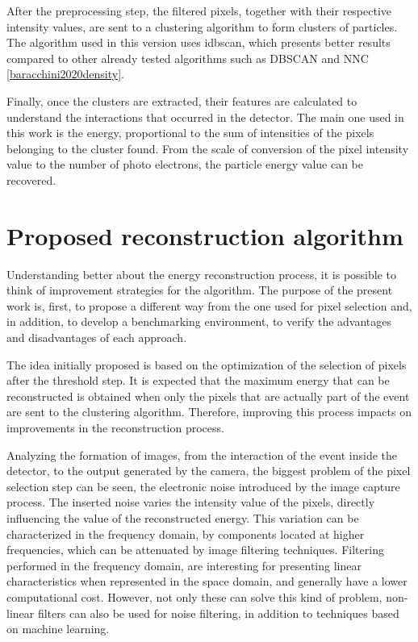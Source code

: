 \documentclass[
        oneside,      %
        english,			
        brazil			 
        ]{abntbibufjf}
\begin{document}
After the preprocessing step, the filtered pixels, together with their respective intensity values, are sent to a clustering algorithm to form clusters of particles. The algorithm used in this version uses idbscan, which presents better results compared to other already tested algorithms such as DBSCAN and NNC \ref{baracchini2020density}.

Finally, once the clusters are extracted, their features are calculated to understand the interactions that occurred in the detector. The main one used in this work is the energy, proportional to the sum of intensities of the pixels belonging to the cluster found. From the scale of conversion of the pixel intensity value to the number of photo electrons, the particle energy value can be recovered.

\section{Proposed reconstruction algorithm}

Understanding better about the energy reconstruction process, it is possible to think of improvement strategies for the algorithm. The purpose of the present work is, first, to propose a different way from the one used for pixel selection and, in addition, to develop a benchmarking environment, to verify the advantages and disadvantages of each approach.

The idea initially proposed is based on the optimization of the selection of pixels after the threshold step. It is expected that the maximum energy that can be reconstructed is obtained when only the pixels that are actually part of the event are sent to the clustering algorithm. Therefore, improving this process impacts on improvements in the reconstruction process. 

Analyzing the formation of images, from the interaction of the event inside the detector, to the output generated by the camera, the biggest problem of the pixel selection step can be seen, the electronic noise introduced by the image capture process. The inserted noise varies the intensity value of the pixels, directly influencing the value of the reconstructed energy. This variation can be characterized in the frequency domain, by components located at higher frequencies, which can be attenuated by image filtering techniques. Filtering performed in the frequency domain, are interesting for presenting linear characteristics when represented in the space domain, and generally have a lower computational cost. However, not only these can solve this kind of problem, non-linear filters can also be used for noise filtering, in addition to techniques based on machine learning.
\end{document}
